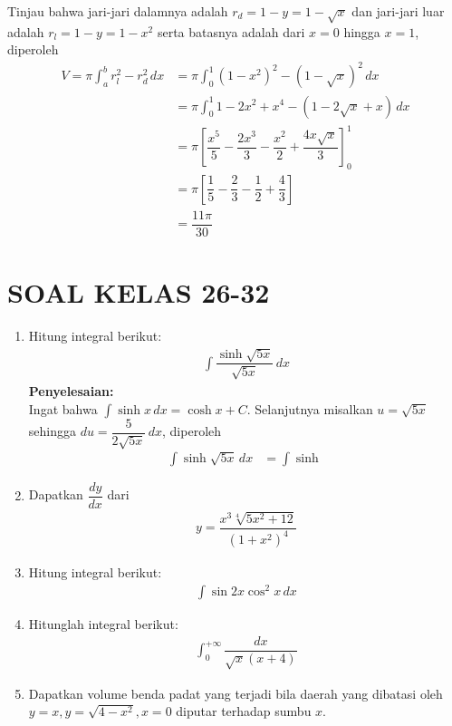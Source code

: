 \documentclass{article}
\begin{document}
\begin{enumerate}
\begin{center}
		\end{center}
		Tinjau bahwa jari-jari dalamnya adalah $r_d=1-y=1-\sqrt{x}$ dan jari-jari luar adalah $r_l=1-y=1-x^2$ serta batasnya adalah dari $x=0$ hingga $x=1$, diperoleh
		\begin{align*}
		V=\pi\int_a^b r_l^2-r_d^2 \, dx &= \pi \int_0^1 (1-x^2)^2-(1-\sqrt{x})^2\, dx\\
		&= \pi \int_0^1 1-2x^2+x^4-(1-2\sqrt{x}+x)\, dx\\
		&= \pi\left[\dfrac{x^5}{5}-\dfrac{2x^3}{3}-\dfrac{x^2}{2}+\dfrac{4x\sqrt{x}}{3}\right]^1_0\\
		&= \pi \left[\dfrac{1}{5}-\dfrac{2}{3}-\dfrac{1}{2}+\dfrac{4}{3}\right]\\
		&= \dfrac{11\pi}{30}
		\end{align*}
\end{enumerate}
\section*{SOAL KELAS 26-32}
\begin{enumerate}
	\item Hitung integral berikut:
	\begin{align*}
	\int \dfrac{\sinh \sqrt{5x}}{\sqrt{5x}}\, dx
	\end{align*}
	\textbf{Penyelesaian:}\\
	Ingat bahwa $\displaystyle \int \sinh x \, dx = \cosh x +C$. Selanjutnya misalkan $u=\sqrt{5x}$ sehingga $du = \dfrac{5}{2\sqrt{5x}}\, dx$, diperoleh 
	\begin{align*}
	\int \sinh \sqrt{5x}\, dx &= \int \sinh \
	\end{align*}
	\item Dapatkan $\dfrac{dy}{dx}$ dari 
	\begin{align*}
	y= \dfrac{x^3\sqrt[4]{5x^2+12}}{(1+x^2)^4}
	\end{align*}
	\item Hitung integral berikut:
	\begin{align*}
	\int \sin 2x\cos^2 x\, dx
	\end{align*}
	\item Hitunglah integral berikut:
	\begin{align*}
	\int_0^{+\infty} \dfrac{dx}{\sqrt{x}(x+4)}
	\end{align*}
	\item Dapatkan volume benda padat yang terjadi bila daerah yang dibatasi oleh $y=x,y=\sqrt{4-x^2},x=0$ diputar terhadap sumbu $x$.
\end{enumerate}
\end{document}
